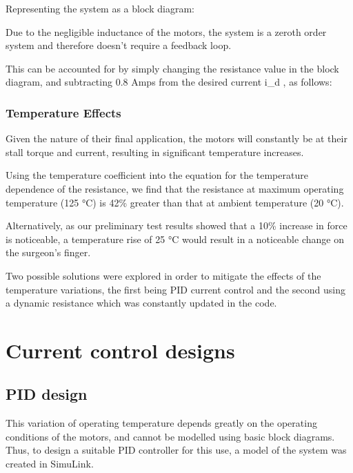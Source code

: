Representing the system as a block diagram:


Due to the negligible inductance of the motors, the system is a zeroth
order system and therefore doesn't require a feedback loop.

This can be accounted for by simply changing the resistance value in the
block diagram, and subtracting 0.8 Amps from the desired current i\_d ,
as follows:


\subsubsection{Temperature Effects}\label{temperature-effects}

Given the nature of their final application, the motors will constantly
be at their stall torque and current, resulting in significant
temperature increases.

Using the temperature coefficient into the equation for the temperature
dependence of the resistance, we find that the resistance at maximum
operating temperature (125 °C) is 42\% greater than that at ambient
temperature (20 °C).

Alternatively, as our preliminary test results showed that a 10\%
increase in force is noticeable, a temperature rise of 25 °C would
result in a noticeable change on the surgeon's finger.

Two possible solutions were explored in order to mitigate the effects of
the temperature variations, the first being PID current control and the
second using a dynamic resistance which was constantly updated in the
code.

\section{Current control designs}\label{sec:current-control-designs}

\subsection{PID design}\label{sub:pid-design}

This variation of operating temperature depends greatly on the operating
conditions of the motors, and cannot be modelled using basic block
diagrams. Thus, to design a suitable PID controller for this use, a
model of the system was created in SimuLink.

